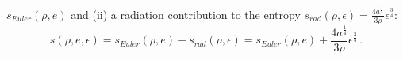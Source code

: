 \documentclass[times,doublespace]{fldauth}%
\begin{document}
$s_{Euler}(\rho, e)$ and (ii) a radiation contribution to the entropy $s_{rad}(\rho,\epsilon)=\tfrac{4 a^\frac{1}{4}}{3\rho} \epsilon^\frac{3}{4}$: 
%
%
\begin{equation}
\label{eq:ent_equ}
s( \rho, e, \epsilon) = s_{Euler}(\rho, e) + s_{rad}(\rho, \epsilon) = s_{Euler}(\rho, e)+ \frac{4a^{\tfrac{1}{4}}}{3\rho} \epsilon^{\tfrac{3}{4}} \, .
\end{equation}
%
%
%
\end{document}
